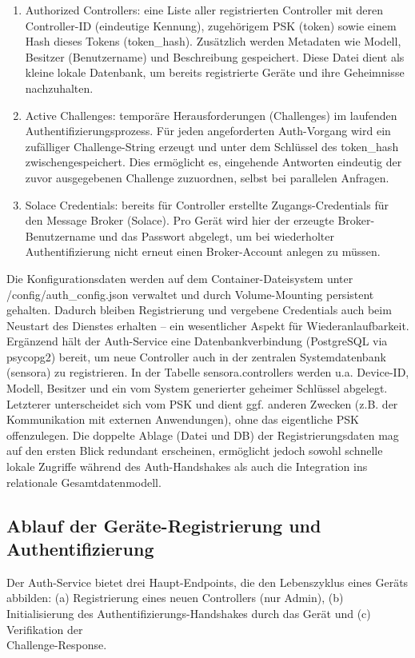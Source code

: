 \begin{enumerate}
    \item Authorized Controllers: eine Liste aller registrierten Controller mit deren Controller-ID (eindeutige Kennung), zugehörigem PSK (token) sowie einem Hash dieses Tokens (token\_hash). Zusätzlich werden Metadaten wie Modell, Besitzer (Benutzername) und Beschreibung gespeichert. Diese Datei dient als kleine lokale Datenbank, um bereits registrierte Geräte und ihre Geheimnisse nachzuhalten.
    \item Active Challenges: temporäre Herausforderungen (Challenges) im laufenden Authentifizierungsprozess.
    Für jeden angeforderten Auth-Vorgang wird ein zufälliger Challenge-String erzeugt und unter dem Schlüssel des token\_hash zwischengespeichert.
    Dies ermöglicht es, eingehende Antworten eindeutig der zuvor ausgegebenen Challenge zuzuordnen, selbst bei parallelen Anfragen.
    \item Solace Credentials: bereits für Controller erstellte Zugangs-Credentials für den Message Broker (Solace). Pro Gerät wird hier der erzeugte Broker-Benutzername und das Passwort abgelegt, um bei wiederholter Authentifizierung nicht erneut einen Broker-Account anlegen zu müssen.
\end{enumerate}
Die Konfigurationsdaten werden auf dem Container-Dateisystem unter \\ /config/auth\_config.json verwaltet und durch Volume-Mounting persistent gehalten. Dadurch bleiben Registrierung und vergebene Credentials auch beim Neustart des Dienstes erhalten – ein wesentlicher Aspekt für Wiederanlaufbarkeit. Ergänzend hält der Auth-Service eine Datenbankverbindung (PostgreSQL via psycopg2) bereit, um neue Controller auch in der zentralen Systemdatenbank (sensora) zu registrieren. In der Tabelle sensora.controllers werden u.a. Device-ID, Modell, Besitzer und ein vom System generierter geheimer Schlüssel abgelegt. Letzterer unterscheidet sich vom PSK und dient ggf. anderen Zwecken (z.B. der Kommunikation mit externen Anwendungen), ohne das eigentliche PSK offenzulegen. Die doppelte Ablage (Datei und DB) der Registrierungsdaten mag auf den ersten Blick redundant erscheinen, ermöglicht jedoch sowohl schnelle lokale Zugriffe während des Auth-Handshakes als auch die Integration ins relationale Gesamtdatenmodell.

\subsection{Ablauf der Geräte-Registrierung und Authentifizierung}
Der Auth-Service bietet drei Haupt-Endpoints, die den Lebenszyklus eines Geräts abbilden: (a) Registrierung eines neuen Controllers (nur Admin), (b) Initialisierung des Authentifizierungs-Handshakes durch das Gerät und (c) Verifikation der \\ Challenge-Response. 

